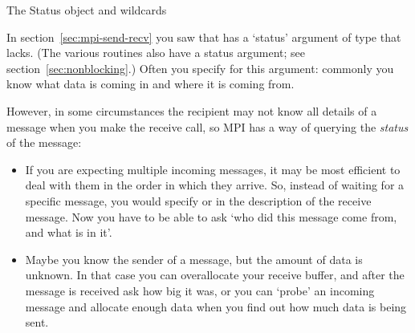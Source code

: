 




 {The Status object and wildcards}
\label{sec:mpi-wildcard}
\label{sec:mpi-status}

In section~\ref{sec:mpi-send-recv}
you saw that  has a `status' argument
of type  that  lacks.
(The various   routines also have a status
argument; see section~\ref{sec:nonblocking}.)
Often you specify 
for this argument: commonly you know
what data is coming in and where it is coming from.

However, in some circumstances the recipient may not know all details of a
message when you make the receive call, so MPI has a way of querying
the \emph{status} of the message:
\begin{itemize}
\item If you are expecting multiple incoming messages, it may be most
  efficient to deal with them in the order in which they arrive. So,
  instead of waiting for a specific message, you would specify
   or  in
  the description of the receive message. 
  Now you have to be able to ask `who did this message come from,
  and what is in it'.
\item Maybe you know the sender of a message, but the amount of data
  is unknown. In that case you can overallocate your receive buffer,
  and after the message is received ask how big it was, or you can
  `probe' an incoming message and allocate enough data when you find
  out how much data is being sent.
\end{itemize}

